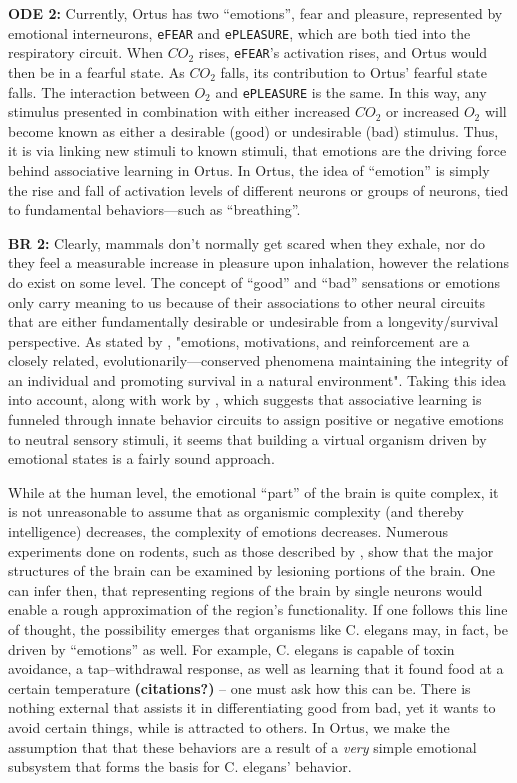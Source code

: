 \documentclass[letterpaper]{article}
\begin{document}
\textbf{ODE 2:} Currently, Ortus has two ``emotions'', fear and pleasure, represented by emotional interneurons, \texttt{eFEAR} and \texttt{ePLEASURE}, which are both tied into the respiratory circuit. When $CO_2$ rises, \texttt{eFEAR}'s activation rises, and Ortus would then be in a fearful state. As $CO_2$ falls, its contribution to Ortus' fearful state falls. The interaction between $O_2$ and \texttt{ePLEASURE} is the same. In this way, any stimulus presented in combination with either increased $CO_2$ or increased $O_2$ will become known as either a desirable (good) or undesirable (bad) stimulus. Thus, it is via linking new stimuli to known stimuli, that emotions are the driving force behind associative learning in Ortus. In Ortus, the idea of ``emotion'' is simply the rise and fall of activation levels of different neurons or groups of neurons, tied to fundamental behaviors---such as ``breathing''.

\textbf{BR 2:} Clearly, mammals don't normally get scared when they exhale, nor do they feel a measurable increase in pleasure upon inhalation, however the relations do exist on some level. The concept of ``good'' and ``bad'' sensations or emotions only carry meaning to us because of their associations to other neural circuits that are either fundamentally desirable or undesirable from a longevity/survival perspective.
As stated by \citet{Verma2015}, "emotions, motivations, and reinforcement are a closely related, evolutionarily---conserved phenomena maintaining the integrity of an individual and promoting survival in a natural environment". Taking this idea into account, along with work by \citet{Gore2015}, which suggests that associative learning is funneled through innate behavior circuits to assign positive or negative emotions to neutral sensory stimuli, it seems that building a virtual organism driven by emotional states is a fairly sound approach. 

While at the human level, the emotional ``part'' of the brain is quite complex, it is not unreasonable to assume that as organismic complexity (and thereby intelligence) decreases, the complexity of emotions decreases. Numerous experiments done on rodents, such as those described by \citet{Weiner2015}, show that the major structures of the brain can be examined by lesioning portions of the brain. One can infer then, that representing regions of the brain by single neurons would enable a rough approximation of the region's functionality. If one follows this line of thought, the possibility emerges that organisms like C. elegans may, in fact, be driven by ``emotions'' as well. For example, C. elegans is capable of toxin avoidance, a tap--withdrawal response, as well as learning that it found food at a certain temperature \textbf{(citations?)} -- one must ask how this can be. There is nothing external that assists it in differentiating good from bad, yet it wants to avoid certain things, while is attracted to others. In Ortus, we make the assumption that that these behaviors are a result of a \textit{very} simple emotional subsystem that forms the basis for C. elegans' behavior.
\end{document}
